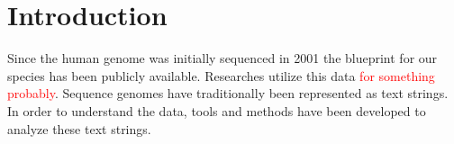 \documentclass[thesis.tex]{subfiles}
\begin{document}
\chapter{Introduction}
Since the human genome was initially sequenced in 2001 \cite{human_genome} the blueprint for our species has been publicly available. Researches utilize this data \textcolor{red}{for something probably}. Sequence genomes have traditionally been represented as text strings. In order to understand the data, tools and methods have been developed to analyze these text strings. 
\end{document}
